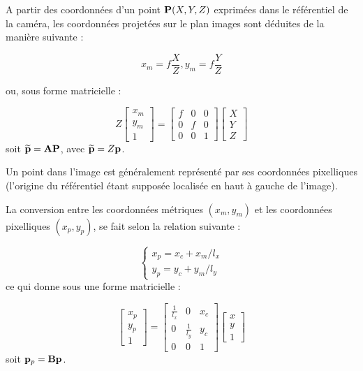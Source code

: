A partir des coordonnées d'un point ${\bf P}(X, Y, Z)$ exprimées dans le 
référentiel de la caméra, les coordonnées projetées sur le plan images sont 
déduites de la manière suivante :

\begin{equation}
x_m = f \frac{X}{Z}, y_m = f \frac{Y}{Z}
\label{chap01:eq01}
\end{equation}

ou, sous forme matricielle :

\begin{equation}
Z
\begin{bmatrix}
x_m \\y_m \\ 1
\end{bmatrix}
=
\begin{bmatrix}
f & 0 & 0 \\ 0 & f & 0 \\ 0 & 0 & 1 
\end{bmatrix}
\begin{bmatrix}
X \\ Y \\ Z 
\end{bmatrix}
\label{chap01:eq02}
\end{equation}
soit $\widetilde {\bf p} = {\bf A}{\bf P}$, avec $\widetilde {\bf p} = Z {\bf 
p}$.

Un point dans l'image est généralement représenté par ses coordonnées 
pi\-xelliques (l'origine du référentiel étant supposée localisée en haut à 
gauche de l'image).

La conversion entre les coordonnées métriques $(x_m, y_m)$ et les coordonnées 
pixelliques $(x_p, y_p)$, se fait selon la relation suivante :

\begin{equation}
\left \lbrace
\begin{matrix}
x_p = x_c + x_m/l_x \\
y_p = y_c + y_m/l_y
\end{matrix} \right .
\label{chap01:eq03}
\end{equation}
ce qui donne sous une forme matricielle :

\begin{equation}
\begin{bmatrix}
x_p \\y_p \\ 1
\end{bmatrix}
=
\begin{bmatrix}
\frac 1 {l_x} & 0 & x_c \\ 0 & \frac 1 {l_y} & y_c \\ 0 & 0 & 1 
\end{bmatrix}
\begin{bmatrix}
x \\ y \\ 1
\end{bmatrix}
\label{chap01:eq04}
\end{equation}
soit ${\bf p}_p = {\bf B} {\bf p}$.

